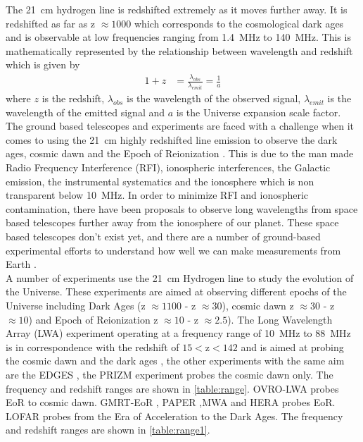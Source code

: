 \documentclass[12pt,a4paper]{report}
\begin{document}
		The \SI{21}{cm} hydrogen line is redshifted extremely as it moves further away. It is redshifted as far as z $\approx1000$ which corresponds to the cosmological dark ages and is observable at low frequencies ranging from \SI{1.4}{MHz} to \SI{140}{MHz}. This is mathematically represented by the relationship between wavelength and redshift which is given by
		\begin{equation} \label{eq1.1}
		\begin{split}
		1+z & = \frac{\lambda_{obs}}{\lambda_{emit}}= \frac{1}{a}
		\end{split}
		\end{equation}
		where $z$ is the redshift, $\lambda_{obs}$ is the wavelength of the observed signal, $\lambda_{emit}$ is the wavelength of the emitted signal and $a$ is the Universe expansion scale factor. The ground based telescopes and experiments are faced with a challenge when it comes to using the \SI{21}{cm} highly redshifted line emission to observe the dark ages, cosmic dawn and the Epoch of Reionization \cite{2016ExA....41..271R}. This is due to the man made Radio Frequency Interference (RFI), ionospheric interferences, the Galactic emission, the instrumental systematics and the ionosphere which is non transparent below \SI{10}{MHz}. In order to minimize RFI and ionospheric contamination, there have been proposals to observe long wavelengths from space based telescopes further away from the ionosphere of our planet. These space based telescopes don't exist yet, and there are a number of ground-based experimental efforts to understand how well we can make measurements from Earth \cite{2016ExA....41..271R}.\\ 
		
		A number of experiments use the \SI{21}{cm} Hydrogen line to study the evolution of the Universe. These experiments are aimed at observing different epochs of the Universe including Dark Ages (z $\approx1100$ - z $\approx30$), cosmic dawn z $\approx30$ - z $\approx10$) and Epoch of Reionization z $\approx10$ - z $\approx2.5$). The Long Wavelength Array (LWA) experiment operating at a frequency range of \SI{10}{MHz} to \SI{88}{MHz} is in correspondence with the redshift of $15<\text{z}<142$ and is aimed at probing the cosmic dawn and the dark ages \cite{2010iska.meetE..24H}, the other experiments with the same aim are the EDGES \cite{2018AAS...23111604M}, the PRIZM \cite{2018arXiv180609531P} experiment probes the cosmic dawn only. The frequency and redshift ranges are shown in \autoref{table:range}. OVRO-LWA \cite{2018AJ....156...32E} probes EoR to cosmic dawn. GMRT-EoR \cite{2013MNRAS.433..639P}, PAPER \cite{2010AJ....139.1468P},MWA \cite{2009IEEEP..97.1497L} and HERA \cite{2017PASP..129d5001D} probes EoR. LOFAR \cite{2013A&A...556A...2V} probes from the Era of Acceleration to the Dark Ages. The frequency and redshift ranges are shown in \autoref{table:range1}. \\			
	
\end{document}
